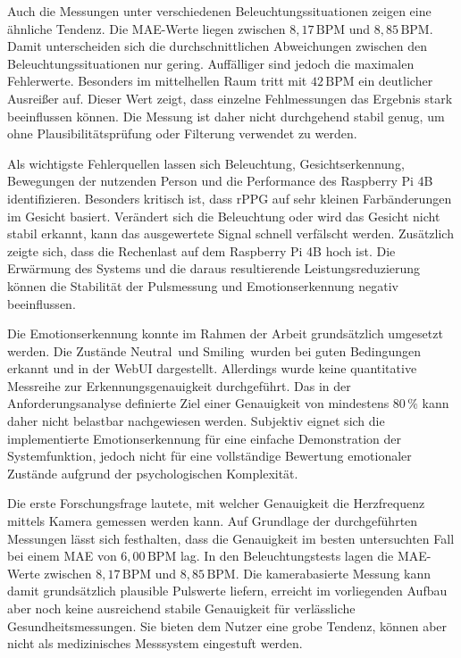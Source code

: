 Auch die Messungen unter verschiedenen Beleuchtungssituationen zeigen eine ähnliche Tendenz. Die MAE-Werte liegen zwischen \(8{,}17\,\mathrm{BPM}\) und \(8{,}85\,\mathrm{BPM}\). Damit unterscheiden sich die durchschnittlichen Abweichungen zwischen den Beleuchtungssituationen nur gering. Auffälliger sind jedoch die maximalen Fehlerwerte. Besonders im mittelhellen Raum tritt mit \(42\,\mathrm{BPM}\) ein deutlicher Ausreißer auf. Dieser Wert zeigt, dass einzelne Fehlmessungen das Ergebnis stark beeinflussen können. Die Messung ist daher nicht durchgehend stabil genug, um ohne Plausibilitätsprüfung oder Filterung verwendet zu werden.

Als wichtigste Fehlerquellen lassen sich Beleuchtung, Gesichtserkennung, Bewegungen der nutzenden Person und die Performance des Raspberry Pi 4B identifizieren. Besonders kritisch ist, dass rPPG auf sehr kleinen Farbänderungen im Gesicht basiert. Verändert sich die Beleuchtung oder wird das Gesicht nicht stabil erkannt, kann das ausgewertete Signal schnell verfälscht werden. Zusätzlich zeigte sich, dass die Rechenlast auf dem Raspberry Pi 4B hoch ist. Die Erwärmung des Systems und die daraus resultierende Leistungsreduzierung können die Stabilität der Pulsmessung und Emotionserkennung negativ beeinflussen.

Die Emotionserkennung konnte im Rahmen der Arbeit grundsätzlich umgesetzt werden. Die Zustände \glqq Neutral\grqq\ und \glqq Smiling\grqq\ wurden bei guten Bedingungen erkannt und in der WebUI dargestellt. Allerdings wurde keine quantitative Messreihe zur Erkennungsgenauigkeit durchgeführt. Das in der Anforderungsanalyse definierte Ziel einer Genauigkeit von mindestens \(80\,\%\) kann daher nicht belastbar nachgewiesen werden. Subjektiv eignet sich die implementierte Emotionserkennung für eine einfache Demonstration der Systemfunktion, jedoch nicht für eine vollständige Bewertung emotionaler Zustände aufgrund der psychologischen Komplexität.

Die erste Forschungsfrage lautete, mit welcher Genauigkeit die Herzfrequenz mittels Kamera gemessen werden kann. Auf Grundlage der durchgeführten Messungen lässt sich festhalten, dass die Genauigkeit im besten untersuchten Fall bei einem MAE von \(6{,}00\,\mathrm{BPM}\) lag. In den Beleuchtungstests lagen die MAE-Werte zwischen \(8{,}17\,\mathrm{BPM}\) und \(8{,}85\,\mathrm{BPM}\). Die kamerabasierte Messung kann damit grundsätzlich plausible Pulswerte liefern, erreicht im vorliegenden Aufbau aber noch keine ausreichend stabile Genauigkeit für verlässliche Gesundheitsmessungen. Sie bieten dem Nutzer eine grobe Tendenz, können aber nicht als medizinisches Messsystem eingestuft werden.


